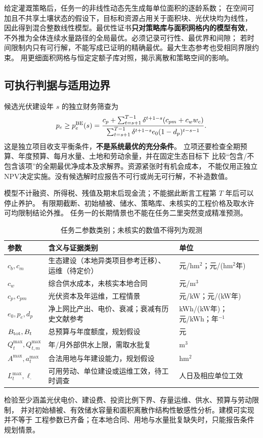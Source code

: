 给定灌溉策略后，任务一的非线性动态先生成每单位面积的逐龄系数；
在空间可加且不共享土壤状态的假设下，目标和资源占用关于面积块、光伏块均为线性，
因此得到混合整数线性模型。最优性证书\textbf{只对策略库与面积网格内的模型有效}，
不外推为全体连续水量路径的全局最优。必须记录可行性、最优界和间隙；
若时间限制内只有可行解，不能写成已证明的精确最优。最大生态参考也受相同界限约束。
用更细面积网格与恒定定额子库对照，揭示离散和策略空间的影响。

\subsection{可执行判据与适用边界}
候选光伏建设年 $s$ 的独立财务筛查为
\begin{equation}\label{eq:threshold}
p_e\ge p_e^{\rm BE}(s)=
\frac{c_p+\sum_{t=s+1}^{T-1}\delta^{t+1-s}(c_{pm}+c_ww_c)}
{\sum_{t=s+1}^{T-1}\delta^{t+1-s}e_0(1-d_p)^{t-s-1}}.
\end{equation}
这是独立项目收支平衡条件，\textbf{不是系统最优的充分条件}。
立项还要检查全期预算、年度预算、每月水量、土地和劳动余量，并在固定生态目标下
比较“包含/不包含该项”的全期最优净成本及求解界。资源紧张时有机会成本，
不能仅用正独立NPV决定实施。没有候选解时应报告不可行或尚无可行解，不补造数值。

模型不计融资、所得税、残值及期末后现金流；不能据此断言工程第 $T$ 年后可以停止养护。
有限期截断、初始植被、储水、策略库、未核实的工程价格及取水许可均限制结论外推。
任务一的长期情景也不能在任务二里突然变成精准预测。

\begin{table}[H]\centering\small
\begin{tabularx}{\textwidth}{lXl}
\toprule
参数 & 含义与证据类别 & 单位\\\midrule
$c_b,c_m$ & 生态建设（本地异类项目参考迁移）、运维（待定价） & 元/hm$^2$；元/(hm$^2$年)\\
$c_w$ & 综合供水成本，未核实本地合同 & 元/m$^3$\\
$c_p,c_{pm}$ & 光伏资本及年运维，工程情景 & 元/kW；元/(kW年)\\
$e_0,p_e,d_p$ & 净上网比产出、电价、衰减；衰减有历史文献参考 & kWh/(kW年)；元/kWh；年$^{-1}$\\
$B_{\rm tot},B_t$ & 总预算与年度额度，规划假设 & 元\\
$Q_t^{\max},Q_{t,m}^{\max}$ & 年/月外部供水上限，需取水批复 & m$^3$\\
$A^{\max},a_t^{\max}$ & 合法用地与年建设能力，规划假设 & hm$^2$\\
$L_t^{\max},\ell_\cdot$ & 可用劳动、单位建设或运维工效，待工时调查 & 人日及相应单位工效\\
\bottomrule
\end{tabularx}
\caption{任务二参数类别；未核实的数值不得列为观测}\label{tab:t2par}
\end{table}

检验至少涵盖光伏电价、建设费、投资比例下界、存量运维、供水、预算与劳动限制，
并对初始植被、有效储水容量和面积离散作结构性敏感性分析。建模可实现并不等于
工程参数已齐备；在本地合同、用地与水量批复缺失时，只能报告条件规划情景。
